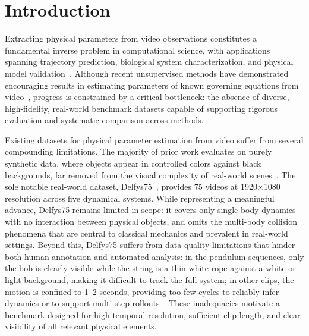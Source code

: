 \documentclass[runningheads]{llncs}
\begin{document}

\section{Introduction}
\label{sec:intro}
Extracting physical parameters from video observations constitutes a fundamental inverse problem in computational science, with applications spanning trajectory prediction, biological system characterization, and physical model validation~\cite{brunton2016discovering, chen2018neural, hofherr2023neural, jaques2019physics, schmidt2009distilling}. Although recent unsupervised methods have demonstrated encouraging results in estimating parameters of known governing equations from video~\cite{hofherr2023neural, jaques2019physics}, progress is constrained by a critical bottleneck: the absence of diverse, high-fidelity, real-world benchmark datasets capable of supporting rigorous evaluation and systematic comparison across methods.

Existing datasets for physical parameter estimation from video suffer from several compounding limitations. The majority of prior work evaluates on purely synthetic data, where objects appear in controlled colors against black backgrounds, far removed from the visual complexity of real-world scenes~\cite{de2018end, jaques2019physics, velivckovic2022reasoning}. The sole notable real-world dataset, Delfys75~\cite{garcia2025learning}, provides 75 videos at 1920$\times$1080 resolution across five dynamical systems. While representing a meaningful advance, Delfys75 remains limited in scope: it covers only single-body dynamics with no interaction between physical objects, and omits the multi-body collision phenomena that are central to classical mechanics and prevalent in real-world settings. Beyond this, Delfys75 suffers from data-quality limitations that hinder both human annotation and automated analysis: in the pendulum sequences, only the bob is clearly visible while the string is a thin white rope against a white or light background, making it difficult to track the full system; in other clips, the motion is confined to 1--2 seconds, providing too few cycles to reliably infer dynamics or to support multi-step rollouts~\cite{garcia2025learning}. These inadequacies motivate a benchmark designed for high temporal resolution, sufficient clip length, and clear visibility of all relevant physical elements.
\end{document}
